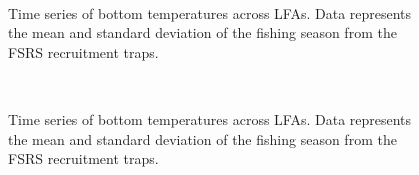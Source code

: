 \documentclass[11pt]{article}
\newcommand{\e}{/backup/bio_data/bio.lobster/figures/} %
\newcommand{\ebh}{/backup/bio_data/bio.lobster/figures/LFA2733Framework2018/} %
\begin{document}
\begin{landscape}
\begin{figure}
        \centering
         \\
                    
                    \caption{Time series of bottom temperatures across LFAs. Data represents the mean and standard deviation of the fishing season from the FSRS recruitment traps.}
        \end{figure}

\begin{figure}
        \centering
         \\
                    
                    \caption{Time series of bottom temperatures across LFAs. Data represents the mean and standard deviation of the fishing season from the FSRS recruitment traps.}
        \end{figure}

\end{landscape}



\end{document}
